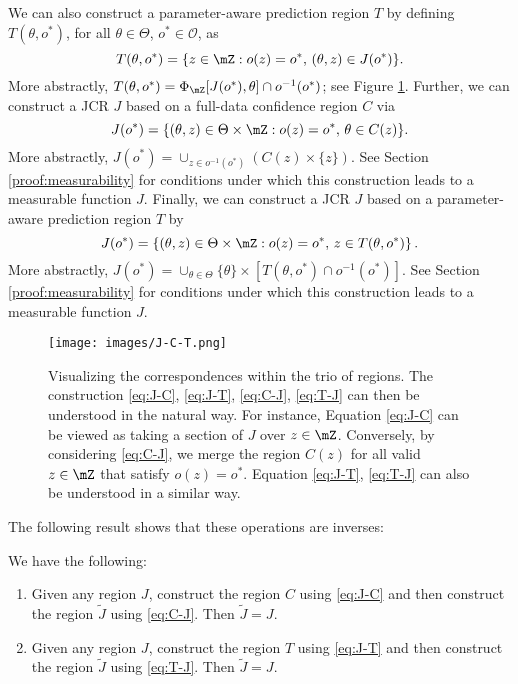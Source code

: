 \documentclass[english]{article}
\begin{document}
We can also   
construct a parameter-aware prediction region $T$ by defining $T(\theta,o^*)$, for all $\theta\in\Theta$, $o^*\in\mathcal{O}$, as
\begin{equation}\label{eq:J-T}
T(\theta,o^*) = \{z\in\mZ: 
o(z) = o^*,\,
(\theta, z) \in J(o^*)\}.
\end{equation}
More abstractly,
$T(\theta,o^*) = \Phi_{\mZ}[J(o^*),\theta] \cap o^{-1}(o^*)$; see Figure \ref{fig:J-C-T}.
Further, we can construct a JCR $J$ based on a full-data confidence region $C$ via  
\begin{equation}\label{eq:C-J}
J(o^*) = \{(\theta, z)\in\Theta\times\mZ:
o(z) = o^*,\,
\theta \in C(z)\}. 
\end{equation}
More abstractly, $J(o^*) = \cup_{z\in o^{-1}(o^*)} \left(C(z) \times \{z\}\right)$. See Section \ref{proof:measurability} for conditions under which this construction leads to a measurable function $J$.
Finally, we can construct a JCR $J$ based on a  parameter-aware prediction region $T$ by 
\begin{equation}\label{eq:T-J}
J(o^*) = \left\{(\theta,z) 
\in\Theta\times\mZ: 
o(z) = o^*,\,
z \in T(\theta,o^*) \right\}.
\end{equation}
More abstractly, $J(o^*) = 
\cup_{\theta\in\Theta} \{\theta\} \times [T(\theta,o^*) \cap o^{-1}(o^*)]$. 
See Section \ref{proof:measurability} for conditions under which this construction leads to a measurable function $J$.
\begin{figure}[ht]
    \centering
    \texttt{[image: images/J-C-T.png]}
    \caption{Visualizing the correspondences within the trio of regions. 
    The construction \eqref{eq:J-C}, \eqref{eq:J-T}, \eqref{eq:C-J}, \eqref{eq:T-J} can then be understood in the natural way. For instance, Equation \eqref{eq:J-C} can be viewed as taking a section of $J$ over $z \in \mZ$. Conversely, by considering \eqref{eq:C-J}, we merge the region $C(z)$ for all valid $z \in \mZ$ that satisfy $o(z) = o^*$. Equation \eqref{eq:J-T}, \eqref{eq:T-J} can also be understood in a similar way.}
    \label{fig:J-C-T}
\end{figure}


The following result shows that these operations are inverses:
\begin{lemma}\label{equivalance}
We have the following:
\begin{enumerate}
    \item Given any region $J$, construct the region $C$ using \eqref{eq:J-C} and then construct the region $\tilde J$ using \eqref{eq:C-J}. Then $\tilde J = J$.
    \item Given any region $J$, construct the region $T$ using \eqref{eq:J-T} and then construct the region $\tilde J$ using \eqref{eq:T-J}. Then $\tilde J = J$.
\end{enumerate}
\end{lemma}
\end{document}
